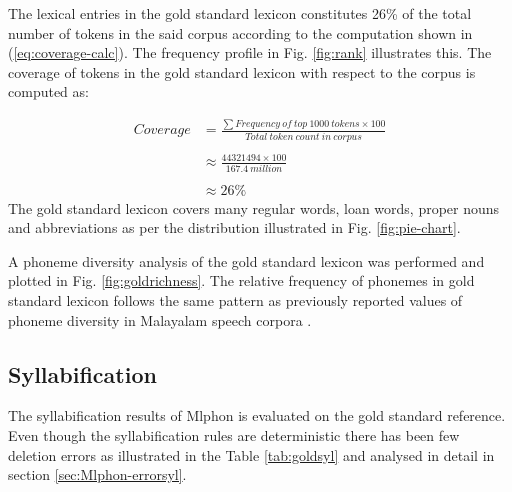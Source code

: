 The lexical entries in the gold standard lexicon constitutes 26\% of the total
number of tokens in the said corpus according to the computation shown in
(\ref{eq:coverage-calc}). The frequency profile in Fig. \ref{fig:rank} illustrates
this. The coverage of tokens in the gold standard lexicon with respect to the
corpus is computed as:

\begin{equation}
	\label{eq:coverage-calc}
	\begin{split}
		Coverage & =\frac{\sum{}{}{Frequency\ of\ top\ 1000\ tokens} \times 100 }{Total\ token\ count\ in\ corpus}  \\ \\
		&  \approx \frac{44321494 \times 100}{167.4\ million} \\ \\
		& \approx 26 \%
	\end{split}
\end{equation}
The gold standard lexicon covers many regular words, loan words, proper nouns and abbreviations as per the distribution illustrated in Fig. \ref{fig:pie-chart}.



A phoneme diversity analysis of the gold standard lexicon was performed and
plotted in Fig. \ref{fig:goldrichness}. The relative frequency of phonemes in gold
standard lexicon follows the same pattern as previously reported values of
phoneme diversity in Malayalam speech corpora \cite{smcspeech}.

\subsection{Syllabification}

The syllabification results of Mlphon is evaluated on the gold standard
reference. Even though the syllabification rules are deterministic there has
been few deletion errors as illustrated in the Table \ref{tab:goldsyl} and analysed
in detail in section \ref{sec:Mlphon-errorsyl}.

